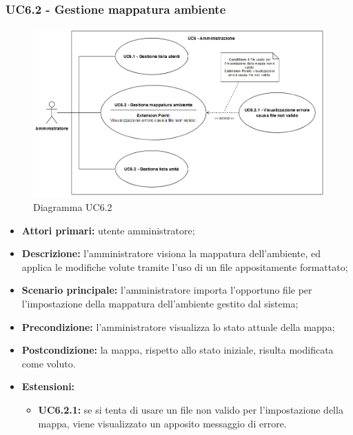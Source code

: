 \subsubsection{UC6.2 - Gestione mappatura ambiente}
	\begin{center}
		\begin{figure}[h!]
			\includegraphics[width=15cm]{images/uc6.png}
			\caption{Diagramma UC6.2}
		\end{figure}
	\end{center}
	\begin{itemize}
		\item \textbf{Attori primari:} utente amministratore;
		\item \textbf{Descrizione:} l'amministratore visiona la mappatura dell'ambiente, ed applica le modifiche volute tramite l'uso di un file appositamente formattato;
		\item \textbf{Scenario principale:} l'amministratore importa l'opportuno file per l'impostazione della mappatura dell'ambiente gestito dal sistema;
		\item \textbf{Precondizione:} l'amministratore visualizza lo stato attuale della mappa;
		\item \textbf{Postcondizione:} la mappa, rispetto allo stato iniziale, risulta modificata come voluto.
		\item \textbf{Estensioni:}
		\begin{itemize}
			\item \textbf{UC6.2.1:} se si tenta di usare un file non valido per l'impostazione della mappa, viene visualizzato un apposito messaggio di errore.
		\end{itemize}
	\end{itemize}


